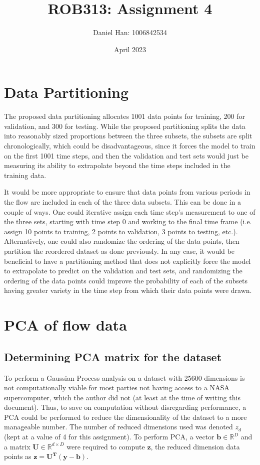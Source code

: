 \documentclass{article}
\title{ROB313: Assignment 4}
\author{Daniel Han: 1006842534}
\date{April 2023}
\begin{document}
\maketitle


\section{Data Partitioning}
The proposed data partitioning allocates 1001 data points for training, 200 for validation, and 300 for testing. While the proposed partitioning splits the data into reasonably sized proportions between the three subsets, the subsets are split chronologically, which could be disadvantageous, since it forces the model to train on the first 1001 time steps, and then the validation and test sets would just be measuring its ability to extrapolate beyond the time steps included in the training data.

It would be more appropriate to ensure that data points from various periods in the flow are included in each of the three data subsets. This can be done in a couple of ways. One could iterative assign each time step's measurement to one of the three sets, starting with time step 0 and working to the final time frame (i.e. assign 10 points to training, 2 points to validation, 3 points to testing, etc.). Alternatively, one could also randomize the ordering of the data points, then partition the reordered dataset as done previously. In any case, it would be beneficial to have a partitioning method that does not explicitly force the model to extrapolate to predict on the validation and test sets, and randomizing the ordering of the data points could improve the probability of each of the subsets having greater variety in the time step from which their data points were drawn.

\section{PCA of flow data}
\subsection{Determining PCA matrix for the dataset}
To perform a Gaussian Process analysis on a dataset with 25600 dimensions is not computationally viable for most parties not having access to a NASA supercomputer, which the author did not (at least at the time of writing this document). Thus, to save on computation without disregarding performance, a PCA could be performed to reduce the dimensionality of the dataset to a more manageable number. The number of reduced dimensions used was denoted $z_d$ (kept at a value of 4 for this assignment). To perform PCA, a vector $\mathbf{b} \in \mathbb{R}^{D}$ and a matrix $\mathbf{U} \in \mathbb{R}^{d \times D}$ were required to compute $\mathbf{z}$, the reduced dimension data points as $\mathbf{z} = \mathbf{U^T}(\mathbf{y} - \mathbf{b})$.
\end{document}
